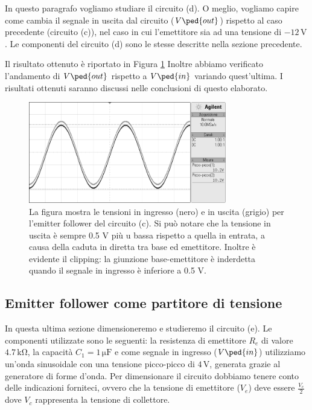 In questo paragrafo vogliamo studiare il circuito (d). O meglio, vogliamo capire come cambia il segnale in uscita dal circuito ($V\ped{out}$) rispetto al caso precedente (circuito (c)), nel caso in cui l'emettitore sia ad una tensione di $-12\,\si{\volt}$.
Le componenti del circuito (d) sono le stesse descritte nella sezione precedente.

Il risultato ottenuto è riportato in Figura \ref{fig:emitter_p}
Inoltre abbiamo verificato l'andamento di $V\ped{out}$ rispetto a $V\ped{in}$ variando quest'ultima. I risultati ottenuti saranno discussi nelle conclusioni di questo elaborato.

\begin{figure}
    \includegraphics[width=0.77\textwidth]{emitter_b.png}
    \caption{La figura mostra le tensioni in ingresso (nero) e in uscita (grigio) per l’emitter follower del circuito (c). Si può notare che la tensione in uscita è sempre
0.5 V più
u bassa rispetto a
quella in entrata, a causa della caduta in diretta tra base ed emettitore. Inoltre è evidente il clipping: la giunzione base-emettitore è inderdetta quando il segnale in ingresso è inferiore a 0.5 V.}
    \label{fig:emitter_p}
\end{figure}

\subsection*{Emitter follower come partitore di tensione}

In questa ultima sezione dimensioneremo e studieremo il circuito (e). Le componenti utilizzate sono le seguenti: la resistenza di emettitore $R_e$ di valore $4.7\,\si{\kilo\ohm}$, la capacità $C_1=1\,\si{\micro\farad}$ e come segnale in ingresso ($V\ped{in}$) utilizziamo un'onda sinusoidale con una tensione picco-picco di $4\,\si{\volt}$, generata grazie al generatore di forme d'onda.
Per dimensionare il circuito dobbiamo tenere conto delle indicazioni forniteci, ovvero che la tensione di emettitore ($V_e$) deve essere $\frac{V_c}{2}$ dove $V_c$ rappresenta la tensione di collettore.

